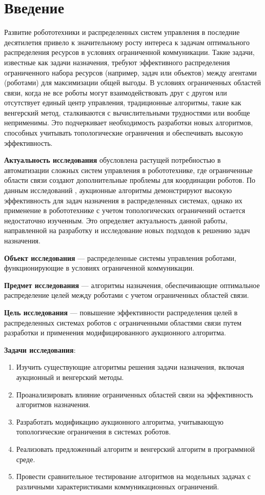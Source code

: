 \chapter*{Введение}

Развитие робототехники и распределенных систем управления в последние десятилетия привело к значительному росту интереса к задачам оптимального распределения ресурсов в условиях ограниченной коммуникации. Такие задачи, известные как задачи назначения, требуют эффективного распределения ограниченного набора ресурсов (например, задач или объектов) между агентами (роботами) для максимизации общей выгоды. В условиях ограниченных областей связи, когда не все роботы могут взаимодействовать друг с другом или отсутствует единый центр управления, традиционные алгоритмы, такие как венгерский метод, сталкиваются с вычислительными трудностями или вообще неприменимы. Это подчеркивает необходимость разработки новых алгоритмов, способных учитывать топологические ограничения и обеспечивать высокую эффективность.

\textbf{Актуальность исследования} обусловлена растущей потребностью в автоматизации сложных систем управления в робототехнике, где ограниченные области связи создают дополнительные проблемы для координации роботов. По данным исследований \cite{bertsekas1990}, аукционные алгоритмы демонстрируют высокую эффективность для задач назначения в распределенных системах, однако их применение в робототехнике с учетом топологических ограничений остается недостаточно изученным. Это определяет актуальность данной работы, направленной на разработку и исследование новых подходов к решению задач назначения.

\textbf{Объект исследования} --- распределенные системы управления роботами, функционирующие в условиях ограниченной коммуникации.

\textbf{Предмет исследования} --- алгоритмы назначения, обеспечивающие оптимальное распределение целей между роботами с учетом ограниченных областей связи.

\textbf{Цель исследования} --- повышение эффективности распределения целей в распределенных системах роботов с ограниченными областями связи путем разработки и применения модифицированного аукционного алгоритма.

\textbf{Задачи исследования}:
\begin{enumerate}
    \item Изучить существующие алгоритмы решения задачи назначения, включая аукционный и венгерский методы.
    \item Проанализировать влияние ограниченных областей связи на эффективность алгоритмов назначения.
    \item Разработать модификацию аукционного алгоритма, учитывающую топологические ограничения в системах роботов.
    \item Реализовать предложенный алгоритм и венгерский алгоритм в программной среде.
    \item Провести сравнительное тестирование алгоритмов на модельных задачах с различными характеристиками коммуникационных ограничений.
\end{enumerate}

